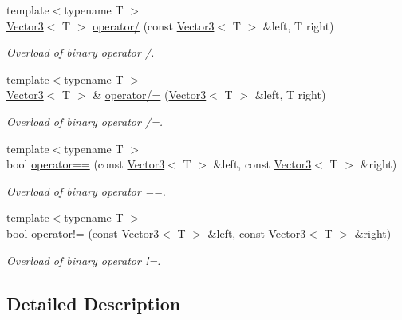 \begin{DoxyCompactItemize}
{\footnotesize template$<$typename T $>$ }\\\hyperlink{class_triton_1_1_util_1_1_vector3}{Vector3}$<$ T $>$ \hyperlink{class_triton_1_1_util_1_1_vector3_ad4ba4a83de236ddeb92a7b759187e90d}{operator/} (const \hyperlink{class_triton_1_1_util_1_1_vector3}{Vector3}$<$ T $>$ \&left, T right)
\begin{DoxyCompactList}\small\item\em Overload of binary operator /. \end{DoxyCompactList}\item 
{\footnotesize template$<$typename T $>$ }\\\hyperlink{class_triton_1_1_util_1_1_vector3}{Vector3}$<$ T $>$ \& \hyperlink{class_triton_1_1_util_1_1_vector3_a8995a700f9dffccc6dddb3696ae17b64}{operator/=} (\hyperlink{class_triton_1_1_util_1_1_vector3}{Vector3}$<$ T $>$ \&left, T right)
\begin{DoxyCompactList}\small\item\em Overload of binary operator /=. \end{DoxyCompactList}\item 
{\footnotesize template$<$typename T $>$ }\\bool \hyperlink{class_triton_1_1_util_1_1_vector3_a388d72db973306a35ba467016b3dee30}{operator==} (const \hyperlink{class_triton_1_1_util_1_1_vector3}{Vector3}$<$ T $>$ \&left, const \hyperlink{class_triton_1_1_util_1_1_vector3}{Vector3}$<$ T $>$ \&right)
\begin{DoxyCompactList}\small\item\em Overload of binary operator ==. \end{DoxyCompactList}\item 
{\footnotesize template$<$typename T $>$ }\\bool \hyperlink{class_triton_1_1_util_1_1_vector3_a608500d1ad3b78082cb5bb4356742bd4}{operator!=} (const \hyperlink{class_triton_1_1_util_1_1_vector3}{Vector3}$<$ T $>$ \&left, const \hyperlink{class_triton_1_1_util_1_1_vector3}{Vector3}$<$ T $>$ \&right)
\begin{DoxyCompactList}\small\item\em Overload of binary operator !=. \end{DoxyCompactList}\end{DoxyCompactItemize}


\subsection{Detailed Description}
